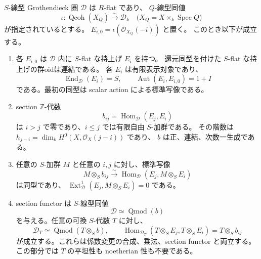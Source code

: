 \begin{lemma}
\label{lem:abel-flat-cover-reconstruction}
$S$-線型 Grothendieck 圏 $\mathcal D$ は $R$-flat であり、
$Q$-線型同値
\[
 \iota:\operatorname{Qcoh}(X_Q)\xrightarrow{\sim}\mathcal D_k
 \quad\bigl(X_Q=X\times_k\operatorname{Spec}Q\bigr)
\]
が指定されているとする。
$E_{i,0}=\iota(\mathcal O_{X_Q}(-i))$ と置く。
このとき以下が成立する。
\begin{enumerate}
\item 各 $E_{i,0}$ は $\mathcal D$ 内に $S$-flat な持上げ $E_i$ を持つ。
還元同型を付けた $S$-flat な持上げの群oidは連結である。
各 $E_i$ は有限表示対象であり、
\[
 \operatorname{End}_{\mathcal D}(E_i)=S,
 \qquad \operatorname{Aut}(E_i,E_{i,0})=1+I
\]
である。最初の同型は scalar action による標準写像である。
\item section $\mathbb Z$-代数
\[
 b_{ij}=\operatorname{Hom}_{\mathcal D}(E_j,E_i)
\]
は $i>j$ で零であり、$i\leq j$ では有限自由 $S$-加群である。
その階数は $h_{j-i}=\dim_k H^0(X,\mathcal O_X(j-i))$ であり、
$b$ は正、連結、次数一生成である。
\item 任意の $S$-加群 $M$ と任意の $i,j$ に対し、標準写像
\begin{equation}\label{eq:abel-flat-cover-universal-hom}
 M\otimes_S b_{ij}\xrightarrow{\sim}
 \operatorname{Hom}_{\mathcal D}(E_j,M\otimes_S E_i)
\end{equation}
は同型であり、
$\operatorname{Ext}^1_{\mathcal D}(E_j,M\otimes_S E_i)=0$ である。
\item section functor は $S$-線型同値
\[
 \mathcal D\simeq\operatorname{Qmod}(b)
\]
を与える。任意の可換 $S$-代数 $T$ に対し、
\[
 \mathcal D_T\simeq\operatorname{Qmod}(T\otimes_S b),
 \qquad
 \operatorname{Hom}_{\mathcal D_T}(T\otimes_SE_j,T\otimes_SE_i)
 =T\otimes_S b_{ij}
\]
が成立する。これらは係数変更の合成、乗法、section functor と両立する。
この部分では $T$ の平坦性も noetherian 性も不要である。
\end{enumerate}
\end{lemma}

